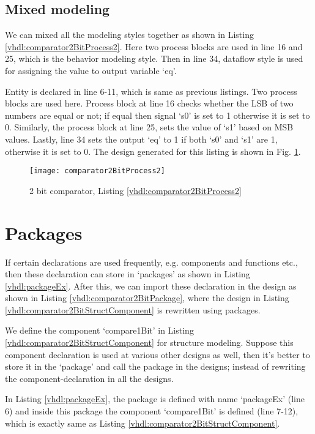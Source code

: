 \subsection{Mixed modeling}
We can mixed all the modeling styles together as shown in Listing \ref{vhdl:comparator2BitProcess2}. Here two process blocks are used in line 16 and 25, which is the behavior modeling style. Then in line 34, dataflow style is used for assigning the value to output variable `eq'.

\begin{explanation}
	Entity is declared in line 6-11, which is same as previous listings. Two process blocks are used here. Process block at line 16 checks whether the LSB of two numbers are equal or not; if equal then signal `s0' is set to 1 otherwise it is set to 0. Similarly, the process block at line 25, sets the value of `s1' based on MSB values. Lastly, line 34 sets the output `eq' to 1 if both `s0' and `s1' are 1, otherwise it is set to 0. The design generated for this listing is shown in Fig. \ref{fig:comparator2BitProcess2}.
\end{explanation}

\begin{figure}
	\centering
	\texttt{[image: comparator2BitProcess2]}
	\caption{2 bit comparator, Listing \ref{vhdl:comparator2BitProcess2}}
	\label{fig:comparator2BitProcess2}
\end{figure}

\section{Packages}\label{sec:ovPackage}
If certain declarations are used frequently, e.g. components and functions etc., then these declaration can store in `packages' as shown in Listing \ref{vhdl:packageEx}. After this, we can import these declaration in the design as shown in Listing \ref{vhdl:comparator2BitPackage}, where the design in Listing \ref{vhdl:comparator2BitStructComponent} is rewritten using packages.

\begin{explanation}
	We define the component `compare1Bit' in Listing \ref{vhdl:comparator2BitStructComponent} for structure modeling. Suppose this component declaration is used at various other designs as well, then it's better to store it in the `package' and call the package in the designs; instead of rewriting the component-declaration in all the designs.
	
	In Listing \ref{vhdl:packageEx}, the package is defined with name `packageEx' (line 6) and inside this package the component `compare1Bit' is defined (line 7-12), which is exactly same as Listing \ref{vhdl:comparator2BitStructComponent}. 
\end{explanation}

